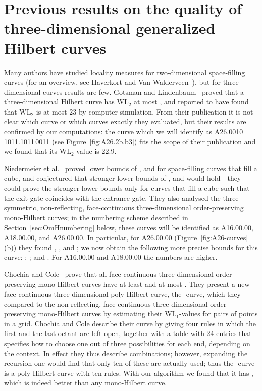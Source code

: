 \documentclass[11pt,a4paper]{article}
\def\WLEuc{\ensuremath{\mathrm{WL}_2}\xspace}
\def\WLMan{\ensuremath{\mathrm{WL}_1}\xspace}
\begin{document}
\section{Previous results on the quality of three-dimensional generalized Hilbert curves}

Many authors have studied locality measures for two-dimensional space-filling curves (for an overview, see Haverkort and Van Walderveen~\cite{Haverkort}), but for three-dimensional curves results are few. Gotsman and Lindenbaum~\cite{Gotsman} proved that a three-dimensional Hilbert curve has \WLEuc at most , and reported to have found that \WLEuc is at most 23 by computer simulation. From their publication it is not clear which curve or which curves exactly they evaluated, but their results are confirmed by our computations: the curve which we will identify as A26.0010\,1011.1011\,0011 (see Figure~\ref{fig:A26.2b.b3}) fits the scope of their publication and we found that its \WLEuc-value is 22.9.

Niedermeier et al.~\cite{Niedermeier} proved lower bounds of ,  and  for space-filling curves that fill a cube, and conjectured that stronger lower bounds of ,  and  would hold---they could prove the stronger lower bounds only for curves that fill a cube such that the exit gate coincides with the entrance gate. They also analysed the three symmetric, non-reflecting, face-continuous three-dimensional order-preserving mono-Hilbert curves; in the numbering scheme described in Section~\ref{sec:OmHnumbering} below, these curves will be identified as A16.00.00, A18.00.00, and A26.00.00. In particular, for A26.00.00 (Figure~\ref{fig:A26-curves}(b)) they found , , and ; we now obtain the following more precise bounds for this curve: ; ; and . For A16.00.00 and A18.00.00 the numbers are higher.

Chochia and Cole~\cite{Chochia} prove that all face-continuous three-dimensional order-preserving mono-Hilbert curves have  at least  and at most . They present a new face-continuous three-dimensional poly-Hilbert curve, the -curve, which they compared to the non-reflecting, face-continuous three-dimensional order-preserving mono-Hilbert curves by estimating  their \WLMan-values for pairs of points in a  grid. Chochia and Cole describe their curve by giving four rules in which the first and the last octant are left open, together with a table with 24 entries that specifies how to choose one out of three possibilities for each end, depending on the context. In effect they thus describe  combinations; however, expanding the recursion one would find that only ten of these are actually used; thus the -curve is a poly-Hilbert curve with ten rules. With our algorithm we found that it has , which is indeed better than any mono-Hilbert curve.
\end{document}
